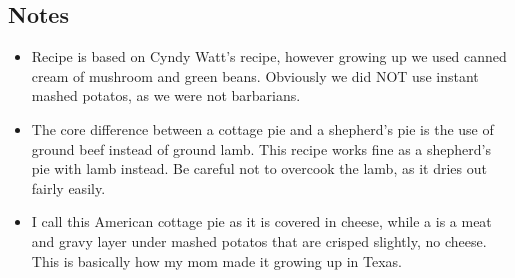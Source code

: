 \begin{multicols}{2}
\subsection*{Notes}
\begin{itemize}
    \item Recipe is based on Cyndy Watt's recipe, however growing up we used canned cream of mushroom and green beans. Obviously we did NOT use instant mashed potatos, as we were not barbarians.
    \item The core difference between a cottage pie and a shepherd's pie is the use of ground beef instead of ground lamb. This recipe works fine as a shepherd's pie with lamb instead. Be careful not to overcook the lamb, as it dries out fairly easily.
    \item I call this American cottage pie as it is covered in cheese, while a  is a meat and gravy layer under mashed potatos that are crisped slightly, no cheese. This is basically how my mom made it growing up in Texas.
\end{itemize}
\end{multicols}
\clearpage